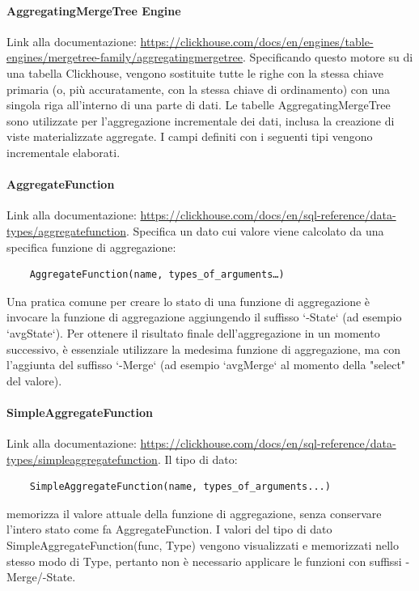 \paragraph{AggregatingMergeTree Engine} \label{sec:AggregatingMergeTree}
Link alla documentazione: \href{https://clickhouse.com/docs/en/engines/table-engines/mergetree-family/aggregatingmergetree}{https://clickhouse.com/docs/en/engines/table-engines/mergetree-family/aggregatingmergetree}.\newline
 Specificando questo motore su di una tabella Clickhouse, vengono sostituite tutte le righe con la stessa chiave primaria (o, più accuratamente, con la stessa chiave di ordinamento) con una singola riga all'interno di una parte di dati.
 Le tabelle AggregatingMergeTree sono utilizzate per l'aggregazione incrementale dei dati, inclusa la creazione di viste materializzate aggregate.
 I campi definiti con i seguenti tipi vengono incrementale elaborati.

\paragraph{AggregateFunction}
Link alla documentazione: \href{https://clickhouse.com/docs/en/sql-reference/data-types/aggregatefunction}{https://clickhouse.com/docs/en/sql-reference/data-types/aggregatefunction}.\newline
Specifica un dato cui valore viene calcolato da una specifica funzione di aggregazione: 
\begin{verbatim}
    AggregateFunction(name, types_of_arguments…) 
\end{verbatim}
Una pratica comune per creare lo stato di una funzione di aggregazione è invocare la funzione di aggregazione aggiungendo il suffisso `-State` (ad esempio `avgState`). Per ottenere il risultato finale dell'aggregazione in un momento successivo, è essenziale utilizzare la medesima funzione di aggregazione, ma con l'aggiunta del suffisso `-Merge` (ad esempio `avgMerge` al momento della "select" del valore).
\paragraph{SimpleAggregateFunction}
Link alla documentazione: \href{https://clickhouse.com/docs/en/sql-reference/data-types/simpleaggregatefunction}{https://clickhouse.com/docs/en/sql-reference/data-types/simpleaggregatefunction}.\newline
Il tipo di dato:
\begin{verbatim}
    SimpleAggregateFunction(name, types_of_arguments...)
\end{verbatim}  memorizza il valore attuale della funzione di aggregazione, senza conservare l'intero stato come fa AggregateFunction.
I valori del tipo di dato SimpleAggregateFunction(func, Type) vengono visualizzati e memorizzati nello stesso modo di Type, pertanto non è necessario applicare le funzioni con suffissi -Merge/-State.

